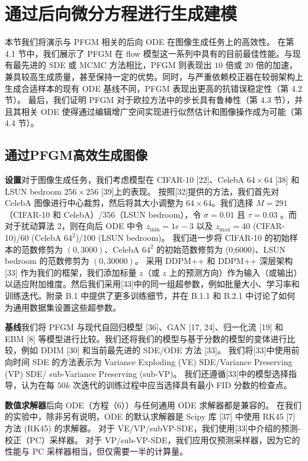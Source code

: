 \documentclass[hyperref,UTF-8]{ctexart}
\newcommand{\0}{\boldsymbol{0}}
\begin{document}
\section{通过后向微分方程进行生成建模}
本节我们将演示与 PFGM 相关的后向 ODE 在图像生成任务上的高效性。 在第 4.1 节中，我们展示了 PFGM 在 flow 模型这一系列中具有的目前最佳性能。与现有最先进的 SDE 或 MCMC 方法相比，PFGM 则表现出 $10$ 倍或 $20$ 倍的加速，兼具较高生成质量，甚至保持一定的优势。同时，与严重依赖校正器在较弱架构上生成合适样本的现有 ODE 基线不同，PFGM 表现出更高的抗错误稳定性（第 4.2 节）。 最后，我们证明 PFGM 对于欧拉方法中的步长具有鲁棒性（第 4.3 节），并且其相关 ODE 使得通过编辑增广空间实现进行似然估计和图像操作成为可能（第 4.4 节）。

\subsection{通过PFGM高效生成图像}

\textbf{设置}\quad 对于图像生成任务，我们考虑模型在 CIFAR-10 [22]、CelebA $64 \times 64$ [38] 和 LSUN bedroom  $256 \times 256$ [39]上的表现。 按照[32]提供的方法，我们首先对 CelebA 图像进行中心裁剪，然后将其大小调整为 $64 \times 64$。我们选择 $M = 291$（CIFAR-10 和 CelebA）/356（LSUN bedroom），令 $\sigma = 0.01$ 且 $\tau = 0.03$ 。而对于扰动算法 2，则在向后 ODE 中令 $z_{\text{min}} = 1e − 3$ 以及 $z_{\text{max}} = 40$ (CIFAR-10)/60 (CelebA $64^2$)/100 (LSUN bedroom)。 我们进一步将 CIFAR-10 的初始样本的范数修剪为 $(0,3000)$、CelebA $64^2$ 的初始范数修剪为 (0;6000)、LSUN bedroom 的范数修剪为 $(0,30000)$。 采用 DDPM++ 和 DDPM++ 深层架构 [33] 作为我们的框架，我们添加标量 $z$（或 $z$ 上的预测方向）作为输入（或输出）以适应附加维度。然后我们采用[33]中的同一组超参数，例如批量大小、学习率和训练迭代。附录 B.1 中提供了更多训练细节，并在 B.1.1 和 B.2.1 中讨论了如何为通用数据集设置这些超参数。

\textbf{基线}\quad 我们将 PFGM 与现代自回归模型 [36]、GAN [17, 24]、归一化流 [19] 和 EBM [8] 等模型进行比较。我们还将我们的模型与基于分数的模型的变体进行比较，例如 DDIM [30] 和当前最先进的 SDE/ODE 方法 [33]。 我们将[33]中使用前向时间 SDE 的方法表示为 Variance Exploding (VE) SDE/Variance Preserving (VP) SDE/ sub-Variance Preserving (sub-VP)。 我们还遵循[33]中的模型选择指导，认为在每 $50k$ 次迭代的训练过程中应当选择具有最小 FID 分数的检查点。

\textbf{数值求解器}\quad 后向 ODE（方程（6））与任何通用 ODE 求解器都是兼容的。 在我们的实验中，除非另有说明，ODE 的默认求解器是 Scipy 库 [37] 中使用 RK45 [7] 方法 (RK45) 的求解器。 对于 VE/VP/subVP-SDE，我们使用[33]中介绍的预测-校正（PC）采样器。 对于 VP/sub-VP-SDE，我们应用仅预测采样器，因为它的性能与 PC 采样器相当，但仅需要一半的计算量。
\end{document}
